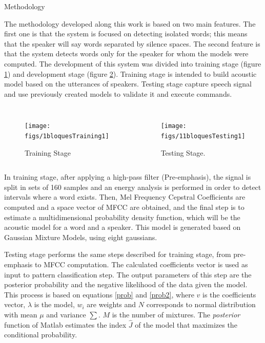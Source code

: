 \documentclass[final]{beamer}
\begin{document}
\begin{frame}{}
\begin{textblock}{39.5}
\begin{block}{Methodology}

The methodology developed along this work is based on two main features. The first one is that the system is focused on detecting isolated words; this means that the speaker will say words separated by silence spaces. The second feature is that the system detects words only for the speaker for whom the models were computed. The development of this system was divided into training stage (figure \ref{trainingBlocks}) and development stage (figure \ref{testingBlocks}). Training stage is intended to build acoustic model based on the utterances of speakers. Testing stage capture speech signal and use previously created models to validate it and execute commands.

\begin{columns}[t]
\centering
\begin{figure}
	\texttt{[image: figs/1bloquesTraining1]}
    \caption{Training Stage}
	\label{trainingBlocks}
\end{figure}
\centering
\begin{figure}
    \texttt{[image: figs/11bloquesTesting1]}
    \caption{Testing Stage.}
	\label{testingBlocks}
\end{figure}
\end{columns}

\vspace{1ex}

In training stage, after applying a high-pass filter (Pre-emphasis), the signal is split in sets of 160 samples and an energy analysis is performed in order to detect intervals where a word exists. Then, Mel Frequency Cepstral Coefficients are computed and a space vector of MFCC are obtained, and the final step is to estimate a multidimensional probability density function, which will be the acoustic model for a word and a speaker. This model is generated based on Gaussian Mixture Models, using eight gaussians.

Testing stage performs the same steps described for training stage, from pre-emphasis to MFCC computation. The calculated coefficients vector is used as input to pattern classification step. The output parameters of this step are the posterior probability and the negative likelihood of the data given the model. This process is based on equations \ref{prob} and \ref{prob2}, where $v$ is the coefficients vector, $\lambda$ is the model, $w_i$ are weights and $N$ corresponds to normal distribution with mean $\mu$ and variance $\sum$. $M$ is the number of mixtures. The \textit{posterior} function of Matlab estimates the index $\hat{J}$ of the model that maximizes the conditional probability.


\end{block}
\end{textblock}
\end{frame}
\end{document}
